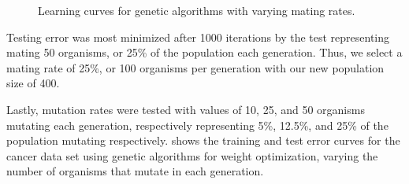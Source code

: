 \documentclass{article}
\begin{document}
\begin{figure}[htb]
        \caption{Learning curves for genetic algorithms with varying mating rates.}
        \label{fig:ga-mating}
        \end{figure}

        Testing error was most minimized after 1000 iterations by the test representing mating 50 organisms, or 25\% of the population each generation. Thus, we select a mating rate of 25\%, or 100 organisms per generation with our new population size of 400.

        Lastly, mutation rates were tested with values of 10, 25, and 50 organisms mutating each generation, respectively representing 5\%, 12.5\%, and 25\% of the population mutating respectively.  shows the training and test error curves for the cancer data set using genetic algorithms for weight optimization, varying the number of organisms that mutate in each generation.
\end{document}
